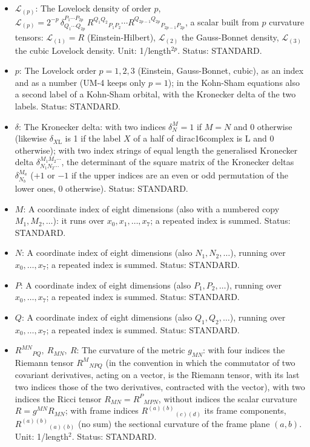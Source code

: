 \documentclass[
  10pt,
]{article}
\providecommand{\tightlist}{%
  \setlength{\itemsep}{0pt}\setlength{\parskip}{0pt}}
\begin{document}
\begin{itemize}
\tightlist
\item
  \(\mathcal{L}_{(p)}\): The Lovelock density of order \(p\),
  \(\mathcal{L}_{(p)} = 2^{-p}\,\delta^{P_1\cdots P_{2p}}_{Q_1\cdots Q_{2p}}\,R^{Q_1Q_2}{}_{P_1P_2}\cdots R^{Q_{2p-1}Q_{2p}}{}_{P_{2p-1}P_{2p}}\),
  a scalar built from \(p\) curvature tensors: \(\mathcal{L}_{(1)} = R\)
  (Einstein-Hilbert), \(\mathcal{L}_{(2)}\) the Gauss-Bonnet density,
  \(\mathcal{L}_{(3)}\) the cubic Lovelock density. Unit:
  1/length\(^{2p}\). Status: STANDARD.
\item
  \(p\): The Lovelock order \(p = 1, 2, 3\) (Einstein, Gauss-Bonnet,
  cubic), as an index and as a number (UM-4 keeps only \(p = 1\)); in
  the Kohn-Sham equations also a second label of a Kohn-Sham orbital,
  with the Kronecker delta of the two labels. Status: STANDARD.
\item
  \(\delta\): The Kronecker delta: with two indices \(\delta^M_N = 1\)
  if \(M = N\) and 0 otherwise (likewise \(\delta_{X\mathrm{L}}\) is 1
  if the label \(X\) of a half of dirac16complex is L and 0 otherwise);
  with two index strings of equal length the generalised Kronecker delta
  \(\delta^{M_1M_2\cdots}_{N_1N_2\cdots}\), the determinant of the
  square matrix of the Kronecker deltas \(\delta^{M_a}_{N_b}\) (\(+1\)
  or \(-1\) if the upper indices are an even or odd permutation of the
  lower ones, 0 otherwise). Status: STANDARD.
\item
  \(M\): A coordinate index of eight dimensions (also with a numbered
  copy \(M_1, M_2, \dots\)): it runs over \(x_0, x_1, \dots, x_7\); a
  repeated index is summed. Status: STANDARD.
\item
  \(N\): A coordinate index of eight dimensions (also
  \(N_1, N_2, \dots\)), running over \(x_0, \dots, x_7\); a repeated
  index is summed. Status: STANDARD.
\item
  \(P\): A coordinate index of eight dimensions (also
  \(P_1, P_2, \dots\)), running over \(x_0, \dots, x_7\); a repeated
  index is summed. Status: STANDARD.
\item
  \(Q\): A coordinate index of eight dimensions (also
  \(Q_1, Q_2, \dots\)), running over \(x_0, \dots, x_7\); a repeated
  index is summed. Status: STANDARD.
\item
  \(R^{MN}{}_{PQ},\ R_{MN},\ R\): The curvature of the metric
  \(g_{MN}\): with four indices the Riemann tensor \(R^M{}_{NPQ}\) (in
  the convention in which the commutator of two covariant derivatives,
  acting on a vector, is the Riemann tensor, with its last two indices
  those of the two derivatives, contracted with the vector), with two
  indices the Ricci tensor \(R_{MN} = R^P{}_{MPN}\), without indices the
  scalar curvature \(R = g^{MN}R_{MN}\); with frame indices
  \(R^{(a)(b)}{}_{(c)(d)}\) its frame components,
  \(R^{(a)(b)}{}_{(a)(b)}\) (no sum) the sectional curvature of the
  frame plane \((a, b)\). Unit: 1/length\(^2\). Status: STANDARD.
\end{itemize}
\end{document}

